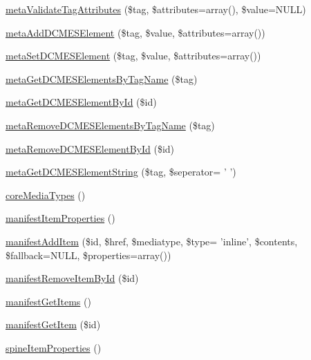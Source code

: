 \begin{DoxyCompactItemize}
\hyperlink{classFunnyMonkey_1_1EPUB_1_1EPUBPackage_a80683de3853ba30ab07a1fbdbd39ad1e}{metaValidateTagAttributes} (\$tag, \$attributes=array(), \$value=NULL)
\item 
\hyperlink{classFunnyMonkey_1_1EPUB_1_1EPUBPackage_aca9e5fd7e6449d64f7a723775573e8ca}{metaAddDCMESElement} (\$tag, \$value, \$attributes=array())
\item 
\hyperlink{classFunnyMonkey_1_1EPUB_1_1EPUBPackage_ac2779b4c1b19eb4c94486df71dca903c}{metaSetDCMESElement} (\$tag, \$value, \$attributes=array())
\item 
\hyperlink{classFunnyMonkey_1_1EPUB_1_1EPUBPackage_a15c0efb03e8190d534e595392c0309ac}{metaGetDCMESElementsByTagName} (\$tag)
\item 
\hyperlink{classFunnyMonkey_1_1EPUB_1_1EPUBPackage_ae60c8d57feba70af4a328df3e27286c5}{metaGetDCMESElementById} (\$id)
\item 
\hyperlink{classFunnyMonkey_1_1EPUB_1_1EPUBPackage_ad5334c1ef6a09920164e37ac5a9d2596}{metaRemoveDCMESElementsByTagName} (\$tag)
\item 
\hyperlink{classFunnyMonkey_1_1EPUB_1_1EPUBPackage_aef0722624ba703173fc30ec5fff4c154}{metaRemoveDCMESElementById} (\$id)
\item 
\hyperlink{classFunnyMonkey_1_1EPUB_1_1EPUBPackage_a3ecb80e2525c2999c0e28264ee747006}{metaGetDCMESElementString} (\$tag, \$seperator= ' ')
\item 
\hyperlink{classFunnyMonkey_1_1EPUB_1_1EPUBPackage_af368b6c38ff7826909356bf4b79c153d}{coreMediaTypes} ()
\item 
\hyperlink{classFunnyMonkey_1_1EPUB_1_1EPUBPackage_a5689aa385603fda65eeca693d0711b2f}{manifestItemProperties} ()
\item 
\hyperlink{classFunnyMonkey_1_1EPUB_1_1EPUBPackage_a0f53574eb308d506b52f458357874c5a}{manifestAddItem} (\$id, \$href, \$mediatype, \$type= 'inline', \$contents, \$fallback=NULL, \$properties=array())
\item 
\hyperlink{classFunnyMonkey_1_1EPUB_1_1EPUBPackage_a6c7d057411ee20314f2bbf98bdca9b21}{manifestRemoveItemById} (\$id)
\item 
\hyperlink{classFunnyMonkey_1_1EPUB_1_1EPUBPackage_a9cd68a69a74070a8c3fbe257caa58684}{manifestGetItems} ()
\item 
\hyperlink{classFunnyMonkey_1_1EPUB_1_1EPUBPackage_a1b5cbdc3705484f51c4bd20a6d48da38}{manifestGetItem} (\$id)
\item 
\hyperlink{classFunnyMonkey_1_1EPUB_1_1EPUBPackage_a5feff28ce51daf35ab76e1b7d71ff2b8}{spineItemProperties} ()

\end{DoxyCompactItemize}
